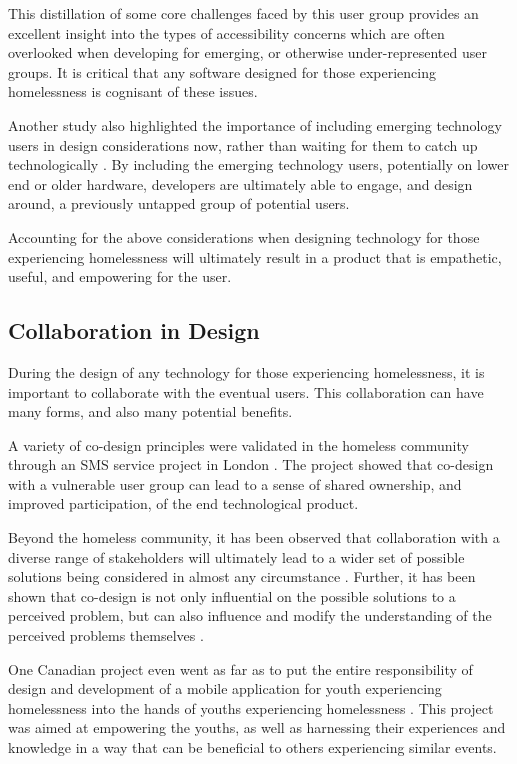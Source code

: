 This distillation of some core challenges faced by this user group provides an excellent insight into the types of accessibility concerns which are often overlooked when developing for emerging, or otherwise under-represented user groups. It is critical that any software designed for those experiencing homelessness is cognisant of these issues.

Another study also highlighted the importance of including emerging technology users in design considerations now, rather than waiting for them to catch up technologically \cite{jones2017beyond}. By including the emerging technology users, potentially on lower end or older hardware, developers are ultimately able to engage, and design around, a previously untapped group of potential users.

Accounting for the above considerations when designing technology for those experiencing homelessness will ultimately result in a product that is empathetic, useful, and empowering for the user.

\subsection{Collaboration in Design}

During the design of any technology for those experiencing homelessness, it is important to collaborate with the eventual users. This collaboration can have many forms, and also many potential benefits.

A variety of co-design principles were validated in the homeless community through an SMS service project in London \cite{kwon2013co}. The project showed that co-design with a vulnerable user group can lead to a sense of shared ownership, and improved participation, of the end technological product.

Beyond the homeless community, it has been observed that collaboration with a diverse range of stakeholders will ultimately lead to a wider set of possible solutions being considered in almost any circumstance \cite{doberstein2016designing}. Further, it has been shown that co-design is not only influential on the possible solutions to a perceived problem, but can also influence and modify the understanding of the perceived problems themselves \cite{melles2012empower}.

One Canadian project even went as far as to put the entire responsibility of design and development of a mobile application for youth experiencing homelessness into the hands of youths experiencing homelessness \cite{buccieri2015empowering}. This project was aimed at empowering the youths, as well as harnessing their experiences and knowledge in a way that can be beneficial to others experiencing similar events.

